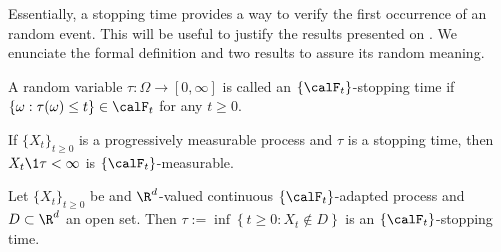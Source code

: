 %
Essentially, a stopping time provides a way to verify the first occurrence of an random event. This will be useful 
to justify the results presented on . We enunciate the formal definition and
two results to assure its random meaning. 

\begin{definition}
	A random variable $\tau:\Omega \to [0, \infty]$ is called an $\{\calF_{t}\}$-stopping time if
	$\{\omega: \tau(\omega)\leq t \}\in \calF_t$ for any $t\geq 0$.
\end{definition}

\begin{thm}
	If $\{ X_t\}_{t\geq 0}$ is a progressively measurable process and $\tau$ is a stopping time,
	then $X_t \1{\tau <\infty}$ is $\{\calF_t \}$-measurable.
\end{thm}
%
\begin{thm}
	Let $\{X_t \}_{t\geq 0}$ be and $\R^d$-valued continuous $\{\calF_t\}$-adapted process and $D\subset \R^d$ an open 
	set. Then
	$
		\tau := \inf\left\{t \geq 0: X_t \notin D \right\}
	$
	is an $\{\calF_t\}$-stopping time.
\end{thm}
%
